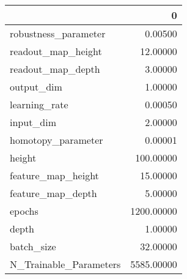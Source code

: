 \begin{tabular}{lr}
\toprule
{} &           0 \\
\midrule
robustness\_parameter   &     0.00500 \\
readout\_map\_height     &    12.00000 \\
readout\_map\_depth      &     3.00000 \\
output\_dim             &     1.00000 \\
learning\_rate          &     0.00050 \\
input\_dim              &     2.00000 \\
homotopy\_parameter     &     0.00001 \\
height                 &   100.00000 \\
feature\_map\_height     &    15.00000 \\
feature\_map\_depth      &     5.00000 \\
epochs                 &  1200.00000 \\
depth                  &     1.00000 \\
batch\_size             &    32.00000 \\
N\_Trainable\_Parameters &  5585.00000 \\
\bottomrule
\end{tabular}
